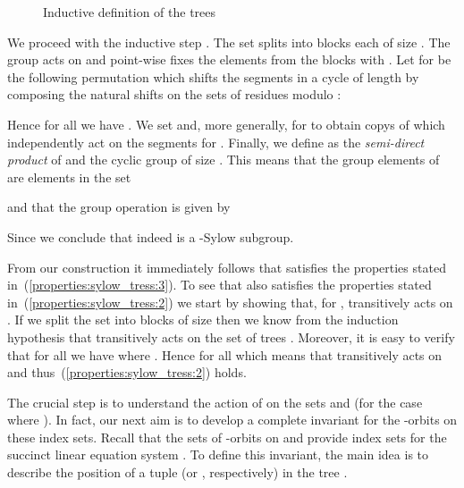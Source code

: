 \documentclass[a4paper,UKenglish]{lipics}
\theoremstyle{plain}
\begin{document}
\begin{figure}[ht]
\caption{Inductive definition of the trees }
\label{fig:definition:trees_q_sylow}
\end{figure}

We proceed with the inductive step .
The set  splits into  blocks  each of size .
The group  acts on  and point-wise fixes
the elements from the blocks  with .
Let  for  be the following 
permutation which shifts
the segments  in a cycle of length  by
composing the natural shifts on the sets of residues modulo :


Hence for all  we have .
We set  and, more generally,  for  to 
obtain  copys of  which independently act on the segments
 for . 
Finally, we define  
as the \emph{semi-direct product} of  and the cyclic group  of size .
This means that the group elements of  are elements in the set

and that the group operation is given by

Since  we conclude that
 indeed is a -Sylow subgroup.

\medskip
From our construction it immediately follows that  satisfies the
properties stated in~(\ref{properties:sylow_tress:3}). To see that
 also satisfies the properties stated
in~(\ref{properties:sylow_tress:2}) we start by showing that, for , 
 transitively acts on .
If we split the set   
into  blocks  of size 
then we know from the induction hypothesis that  transitively
acts on the set of trees . 
Moreover, it is easy to verify that for all  we have
 where .
Hence  for all  which means that
 transitively acts on  and
thus~(\ref{properties:sylow_tress:2}) holds.


\bigskip
The crucial step is to understand the action of 
on the sets  and  (for the case where 
).
In fact, our next aim is to develop a complete invariant for 
the -orbits on these index sets. Recall that the sets 
of -orbits on  and  provide index sets for 
the succinct linear equation system 
.
To define this invariant, the main idea is to describe the position 
of a tuple  (or , respectively) in the tree 
.
\end{document}
